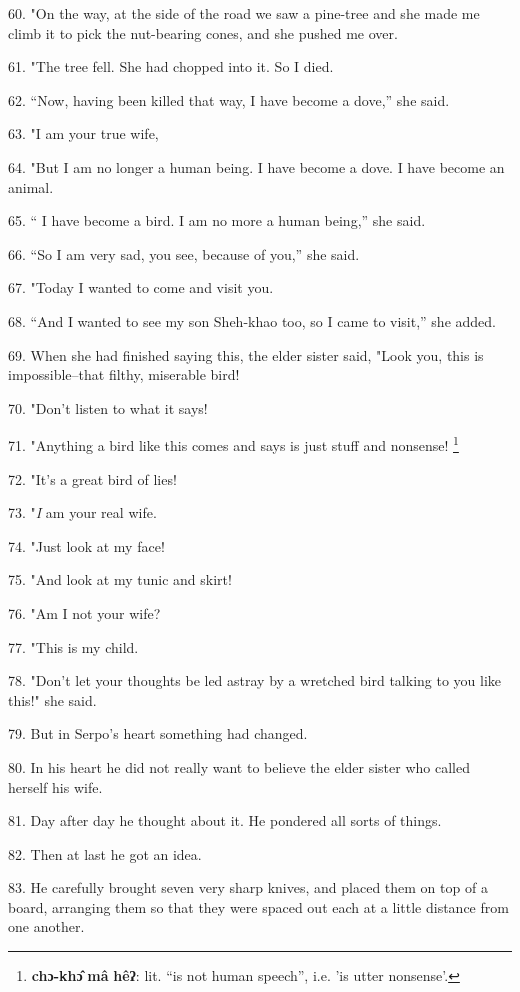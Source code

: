 60. "On the way, at the side of the road we saw a pine-tree and she made
me climb it to pick the nut-bearing cones, and she pushed me over.

61. "The tree fell. She had chopped into it. So I died.

62. ``Now, having been killed that way, I have become a dove,''
she said.

63. "I am your true wife,

64. "But I am no longer a human being. I have become a dove. I have become
an animal.

65. `` I have become a bird. I am no more a human being,'' she
said.

66. ``So I am very sad, you see, because of you,'' she said.

67. "Today I wanted to come and visit you.

68. ``And I wanted to see my son Sheh-khao too, so I came to visit,''
she added.

69. When she had finished saying this, the elder sister said, "Look you,
this is impossible--that filthy, miserable bird!

70. "Don't listen to what it says!

71. "Anything a bird like this comes and says is just stuff and nonsense!
\footnote{\textbf{chɔ-khɔ̂} \textbf{mâ} \textbf{hêʔ}: lit. ``is not human speech'', i.e. 'is utter nonsense'.}

72. "It's a great bird of lies!

73. "\textit{I} am your real wife.

74. "Just look at my face!

75. "And look at my tunic and skirt!

76. "Am I not your wife?

77. "This is my child.

78. "Don't let your thoughts be led astray by a wretched bird talking
to you like this!" she said.

79. But in Serpo's heart something had changed.

80. In his heart he did not really want to believe the elder sister who called
herself his wife.

81. Day after day he thought about it. He pondered all sorts of things.

82. Then at last he got an idea.

83. He carefully brought seven very sharp knives, and placed them on top of a board,
arranging them so that they were spaced out each at a little distance from one
another.

